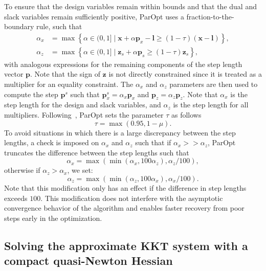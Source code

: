 \documentclass[12pt]{article}
\newcommand{\mb}{\mathbf}
\begin{document}
To ensure that the design variables remain within bounds and that the dual and slack variables remain sufficiently positive, ParOpt uses a fraction-to-the-boundary rule, such that
%
\begin{equation*}
  \begin{aligned}
    \alpha_{x} & = \max\left\{ \alpha \in (0, 1]\;|\;
      \mb{x} + \alpha \mb{p}_{x} - \mb{l} \ge (1 - \tau)(\mb{x} - \mb{l}) \right\}, \\
      \alpha_{z} & = \max\left\{ \alpha \in (0, 1]\;|\;
      \mb{z}_{s} + \alpha \mb{p}_{s} \ge (1 - \tau)\mb{z}_{s} \right\},
  \end{aligned}
\end{equation*}
%
with analogous expressions for the remaining components of the step length vector $\mb{p}$.
Note that the sign of $\mb{z}$ is not directly constrained since it is treated as a multiplier for an equality constraint.
The $\alpha_{x}$ and $\alpha_{z}$ parameters are then used to compute the step $\mb{p}^{s}$ such that $\mb{p}_{x}^{s} = \alpha_{x} \mb{p}_{x}$ and $\mb{p}_{z} = \alpha_{z}\mb{p}_{z}$.
Note that $\alpha_{x}$ is the step length for the design and slack variables, and $\alpha_{z}$ is the step length for all multipliers.
Following~\citet{Wachter:2006:IPOPT}, ParOpt sets the parameter $\tau$ as follows
%
\begin{equation*}
  \tau = \max(0.95, 1 - \mu).
\end{equation*}
To avoid situations in which there is a large discrepancy between the step lengths, a check is imposed on $\alpha_{x}$ and $\alpha_{z}$ such that if $\alpha_{x} >> \alpha_z$, ParOpt truncates the difference between the step lengths such that
%
\begin{equation*}
  \alpha_x = \max(\min(\alpha_x, 100\alpha_z), \alpha_z/100),
\end{equation*}
otherwise if $\alpha_z > \alpha_{x}$, we set:
\begin{equation*}
  \alpha_z = \max(\min(\alpha_z, 100\alpha_x), \alpha_x/100).
\end{equation*}
Note that this modification only has an effect if the difference in step lengths exceeds $100$.
This modification does not interfere with the asymptotic convergence behavior of the algorithm and enables faster recovery from poor steps early in the optimization.

\subsection{Solving the approximate KKT system with a compact quasi-Newton Hessian}
\end{document}

